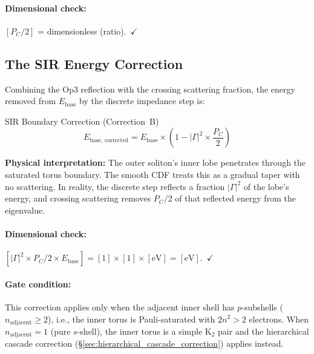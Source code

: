 \paragraph{Dimensional check:} $[P_C/2]$ = dimensionless (ratio).~$\checkmark$

\subsection{The SIR Energy Correction}
\label{sec:sir_correction}

Combining the Op3 reflection with the crossing scattering fraction, the energy removed from $E_\text{base}$ by the discrete impedance step is:
\begin{resultbox}{SIR Boundary Correction (Correction~B)}
\begin{equation}
    \boxed{E_\text{base, corrected} = E_\text{base} \times \left(1 - |\Gamma|^2 \times \frac{P_C}{2}\right)}
    \label{eq:sir_correction}
\end{equation}
\end{resultbox}

\noindent\textbf{Physical interpretation:} The outer soliton's inner lobe penetrates through the saturated torus boundary.  The smooth CDF treats this as a gradual taper with no scattering.  In reality, the discrete step reflects a fraction $|\Gamma|^2$ of the lobe's energy, and crossing scattering removes $P_C/2$ of that reflected energy from the eigenvalue.

\paragraph{Dimensional check:} $[|\Gamma|^2 \times P_C/2 \times E_\text{base}] = [1] \times [1] \times [\text{eV}] = [\text{eV}]$.~$\checkmark$

\paragraph{Gate condition:}  This correction applies only when the adjacent inner shell has $p$-subshells ($n_\text{adjacent} \geq 2$), i.e., the inner torus is Pauli-saturated with $2n^2 > 2$ electrons.  When $n_\text{adjacent} = 1$ (pure $s$-shell), the inner torus is a simple K$_2$ pair and the hierarchical cascade correction (\S\ref{sec:hierarchical_cascade_correction}) applies instead.

